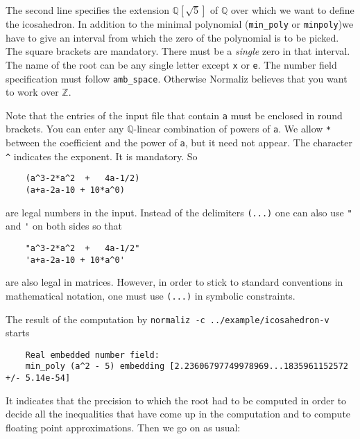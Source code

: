 \documentclass[12pt,a4paper]{scrartcl}
\theoremstyle{definition}
\def\ZZ{{\mathbb Z}}
\def\QQ{{\mathbb Q}}
\begin{document}
{\begin{minipage}[t]{0.4\textwidth}
	\end{minipage}
	
	The second line specifies the extension $\QQ[\sqrt 5]$ of $\QQ$ over which we want to define the icosahedron. In addition to the minimal polynomial (\verb|min_poly| or \verb|minpoly|)we have to give an interval from which the zero of the polynomial is to be picked. The square brackets are mandatory. There must be a \emph{single} zero in that interval. The name of the root can be any single letter except \verb|x| or \verb|e|. The number field specification must follow \verb|amb_space|. Otherwise Normaliz believes that you want to work over $\ZZ$. 
	
	Note that the entries of the input file that contain \verb|a| must be enclosed in round brackets. You can enter any $\QQ$-linear combination of powers of \verb|a|. We allow \verb|*| between the coefficient and the power of \verb|a|, but it need not appear. The character \verb|^| indicates the exponent. It is mandatory. So
	\begin{Verbatim}
	(a^3-2*a^2  +   4a-1/2)
	(a+a-2a-10 + 10*a^0)
	\end{Verbatim}
	are legal numbers in the input. Instead of the delimiters \verb|(...)| one can also use \verb|"|  and \verb|'| on both sides so that 
	\begin{Verbatim}
	"a^3-2*a^2  +   4a-1/2"
	'a+a-2a-10 + 10*a^0'
	\end{Verbatim}
	are also legal in matrices. However, in order to stick to standard conventions in mathematical notation, one must use  \verb|(...)| in symbolic constraints.
	
	The result of the computation by \verb|normaliz -c ../example/icosahedron-v| starts
	\begin{Verbatim}
	Real embedded number field:
	min_poly (a^2 - 5) embedding [2.23606797749978969...1835961152572 +/- 5.14e-54]
	\end{Verbatim}
	It indicates that the precision to which the root had to be computed in order to decide all the inequalities that have come up in the computation and to compute floating point approximations. Then we go on as usual:
	
}
\end{document}
